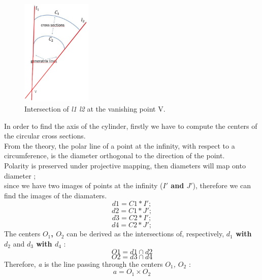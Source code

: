 \documentclass[a4paper, 11pt, oneside, openright, english]{book}
\begin{document}
\begin{figure}[H]
    \centering
    \includegraphics[width=0.3\textwidth]{../images/vanishinpoint.png}
    \caption{ Intersection of \textit{l1 l2} at the vanishing point V.}
    \label{fig:vanishinpoint}
\end{figure}
In order to find the axis of the cylinder, firstly we have to compute the centers of the circular cross sections.\\
From the theory, the polar line of a point at the infinity, with respect to a circumference, is the diameter orthogonal to the direction of the point.\\
Polarity is preserved under projective mapping, then diameters will map onto diameter ;\\ since we have two images of points at the infinity (\textbf{$I'$ and $J'$}), therefore we can find the images of the diamaters.
\begin{equation}
    d1 = C1 * I';
\end{equation}
\begin{equation}
    d2 = C1 * J';
\end{equation}
\begin{equation}
    d3 = C2 * I';
\end{equation}
\begin{equation}
    d4 = C2 * J';
\end{equation}
The centers \textbf{$O_1$, $O_2$} can be derived as the intersections of, respectively, \textbf{$d_1$ with $d_2$} and \textbf{$d_3$ with $d_4$} :  
\begin{equation}
    O1 = d1 \cap d2
\end{equation}
\begin{equation}
    O2 = d3 \cap d4
\end{equation}
Therefore, \textit{a} is the line passing through the centers \textit{$O_1$, $O_2$} :
\begin{equation}
    a = O_1 \times O_2
\end{equation}
\end{document}
